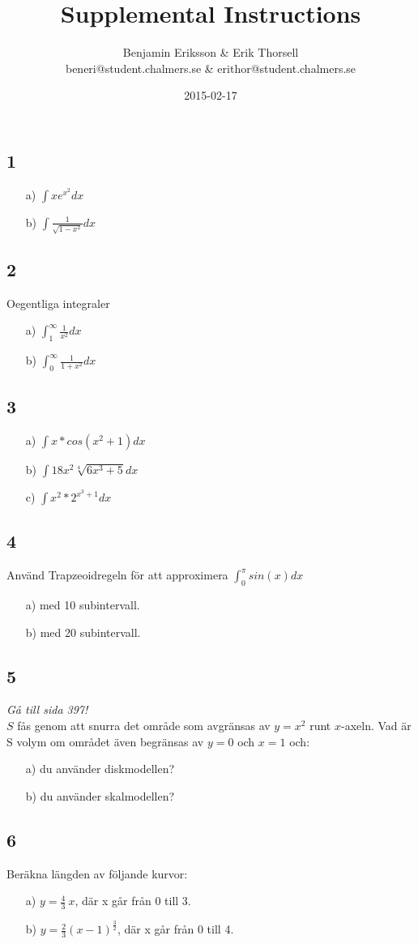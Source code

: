 \documentclass{article}
\title{Supplemental Instructions}
\author{Benjamin Eriksson \& Erik Thorsell \\ 
		\small{beneri@student.chalmers.se} \&
		\small{erithor@student.chalmers.se}
}
\date{
      2015-02-17
     }
\begin{document}
\maketitle
\subsection*{1} 
\begin{itemize} 
    \item[a) ] $\int xe^{x^2} dx $
    \item[b) ] $\int \frac{1}{\sqrt{1-x^2}} dx$ 
\end{itemize}

\subsection*{2} Oegentliga integraler
\begin{itemize}
    \item[a) ] $\int_{1}^{\infty} \frac{1}{x^2} dx$
    \item[b) ] $\int_{0}^{\infty} \frac{1}{1+x^2} dx$
\end{itemize}

\subsection*{3}
\begin{itemize}
    \item[a) ] $\int x*cos(x^2+1) dx$
    \item[b) ] $\int 18x^2 \sqrt[4]{6x^3+5}dx$ 
    \item[c) ] $\int x^2*2^{x^3+1} dx$ 
\end{itemize}

\subsection*{4}
Använd Trapzeoidregeln för att approximera $\int_0^{\pi} sin(x) dx$
\begin{itemize}
    \item[a) ] med 10 subintervall.
    \item[b) ] med 20 subintervall.
\end{itemize}   

\subsection*{5}
{\it Gå till sida 397!}\\
$S$ fås genom att snurra det område som avgränsas av $y = x^2$ 
runt $x$-axeln. Vad är S volym om området även begränsas av $y = 0$ och 
$x = 1$ och: 
\begin{itemize}
    \item[a) ] du använder diskmodellen?
    \item[b) ] du använder skalmodellen?
\end{itemize}

\subsection*{6}
Beräkna längden av följande kurvor: \\
\begin{itemize}
	\item[a) ] $y = \frac{4}{3} \> x$, där x går från 0 till 3.
	\item[b) ] $y = \frac{2}{3} (x-1)^{ \frac{3}{2} }$, där x går från 0 till 4. 
\end{itemize}
\end{document}

